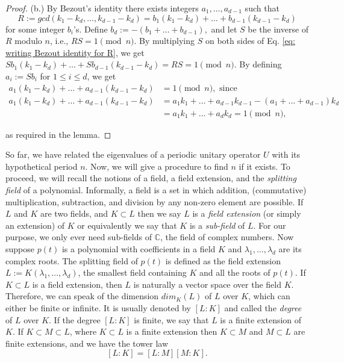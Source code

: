\documentclass[a4paper,onecolumn,accepted=2026-04-08,10pt]{quantumarticle}
\theoremstyle{definition}
\begin{document}
\begin{proof}
(b.) By Bezout's identity there exists integers $a_1, \ldots, a_{d-1}$ such that 
\begin{equation}\label{eq: writing Bezout identity for R}
    R := gcd(k_1 - k_d, \ldots, k_{d-1} - k_d) = b_1(k_1 - k_{d}) + \ldots + b_{d-1} (k_{d-1} - k_d) 
\end{equation}
for some integer $b_i$'s.  Define $b_d := -(b_1 +\ldots + b_{d-1}),$ and let $S$ be the inverse of $R$ modulo $n$, i.e., $RS = 1 \pmod{n}$. By multiplying $S$ on both sides of Eq. \eqref{eq: writing Bezout identity for R}, we get $Sb_1(k_1 - k_{d}) + \ldots + Sb_{d-1} (k_{d-1} - k_d) = RS = 1 \pmod{n}$. By defining $a_i :=Sb_i$ for $1\leq i \leq d$, we get 
\begin{align}
    a_1(k_1 - k_{d}) + \ldots + a_{d-1} (k_{d-1} - k_d) &= 1 \pmod{n},  \, \,  \text{since}\\
     \nonumber a_1(k_1 - k_{d}) + \ldots + a_{d-1} (k_{d-1} - k_d) & = a_1k_1 + \ldots + a_{d-1}k_{d-1} - ( a_1 + \dots + a_{d-1})k_d \\
   \nonumber  & = a_1k_1 + \ldots + a_dk_d = 1 \pmod{n},
\end{align}

as required in the lemma. 
\end{proof}


So far, we have related the eigenvalues of a periodic unitary operator $U$ with its hypothetical period $n$. Now, we will give a procedure to find $n$ if it exists. To proceed, we will recall the notions of a field, a field extension, and the \textit{splitting field} of a polynomial. Informally, a field is a set in which addition, (commutative) multiplication, subtraction, and division by any non-zero element are possible. If $L$ and $K$ are two fields, and $K \subset L$ then we say $L$ is a \textit{field extension} (or simply an extension) of $K$ or equivalently we say that $K$ is a \textit{sub-field} of $L$. For our purpose, we only ever need sub-fields of $\mathbb{C}$, the field of complex numbers. Now suppose $p(t)$ is a polynomial with coefficients in a field $K$ and $\lambda_1, \ldots ,\lambda_d$ are its complex roots. The splitting field of $p(t)$ is defined as the field extension $L:=K(\lambda_1,\dots,\lambda_d)$, the smallest field containing $K$ and all the roots of $p(t)$.  
If $K \subset L$ is a field extension, then $L$ is naturally a vector space over the field $K$. Therefore, we can speak of the dimension $dim_{K}(L)$ of $L$ over $K$, which can either be finite or infinite.  It is usually denoted by $[L:K]$ and called the \textit{degree} of $L$ over $K$. If the degree $[L:K]$ is finite, we say that $L$ is a finite extension of $K$. If $K \subset M \subset L$, where $K\subset L$ is a finite extension then $K \subset M$ and $M \subset L$ are finite extensions, and we have the tower law 
\begin{equation}\label{eq: tower law}
    [L:K] = [L:M] [M:K].
\end{equation}
\end{document}
